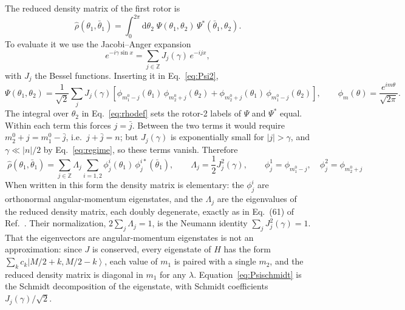 \documentclass[aps,preprint,12pt,superscriptaddress,nofootinbib]{revtex4-2}
\newcommand{\ket}[1]{\left|#1\right\rangle}
\newcommand{\dd}{\mathrm{d}}
\begin{document}
The reduced density matrix of the first rotor is
\begin{equation}
\hat\rho(\theta_{1},\bar\theta_{1})=\int_{0}^{2\pi}\dd\theta_{2}\;
\Psi(\theta_{1},\theta_{2})\,\Psi^{*}(\bar\theta_{1},\theta_{2}).
\label{eq:rhodef}
\end{equation}
To evaluate it we use the Jacobi--Anger expansion~\cite{DLMF}
\begin{equation}
e^{-i\gamma\sin x}=\sum_{j\in\mathbb{Z}}J_{j}(\gamma)\,e^{-ijx},
\label{eq:JA}
\end{equation}
with $J_{j}$ the Bessel functions. Inserting it in Eq.~\eqref{eq:Psi2},
\begin{equation}
\Psi(\theta_{1},\theta_{2})=\frac{1}{\sqrt2}\sum_{j}J_{j}(\gamma)\left[
\phi_{m_{1}^{0}-j}(\theta_{1})\,\phi_{m_{2}^{0}+j}(\theta_{2})
+\phi_{m_{2}^{0}+j}(\theta_{1})\,\phi_{m_{1}^{0}-j}(\theta_{2})\right],\qquad
\phi_{m}(\theta)=\frac{e^{im\theta}}{\sqrt{2\pi}}.
\label{eq:Psischmidt}
\end{equation}
The integral over $\theta_{2}$ in Eq.~\eqref{eq:rhodef} sets the rotor-2 labels of
$\Psi$ and $\Psi^{*}$ equal. Within each term this forces $j=\bar j$. Between the two
terms it would require $m_{2}^{0}+j=m_{1}^{0}-\bar j$, i.e.\ $j+\bar j=n$; but
$J_{j}(\gamma)$ is exponentially small for $|j|>\gamma$, and $\gamma\ll|n|/2$ by
Eq.~\eqref{eq:regime}, so these terms vanish. Therefore
\begin{equation}
\boxed{\;
\hat\rho(\theta_{1},\bar\theta_{1})=\sum_{j\in\mathbb{Z}}\Lambda_{j}\sum_{i=1,2}
\phi^{i}_{j}(\theta_{1})\,\phi^{i*}_{j}(\bar\theta_{1}),\qquad
\Lambda_{j}=\frac12J_{j}^{2}(\gamma),\qquad
\phi^{1}_{j}=\phi_{m_{1}^{0}-j},\quad\phi^{2}_{j}=\phi_{m_{2}^{0}+j}\;}
\label{eq:rho}
\end{equation}
When written in this form the density matrix is elementary: the $\phi^{i}_{j}$ are
orthonormal angular-momentum eigenstates, and the $\Lambda_{j}$ are the eigenvalues
of the reduced density matrix, each doubly degenerate, exactly as in Eq.~(61) of
Ref.~\cite{DKS}. Their normalization, $2\sum_{j}\Lambda_{j}=1$, is the Neumann
identity $\sum_{j}J_{j}^{2}(\gamma)=1$. That the eigenvectors are angular-momentum
eigenstates is not an approximation: since $J$ is conserved, every eigenstate of $H$
has the form $\sum_{k}c_{k}\ket{M/2+k,M/2-k}$, each value of $m_{1}$ is paired with
a single $m_{2}$, and the reduced density matrix is diagonal in $m_{1}$ for any
$\lambda$. Equation~\eqref{eq:Psischmidt} is the Schmidt decomposition of the
eigenstate, with Schmidt coefficients $J_{j}(\gamma)/\sqrt2$.
\end{document}
